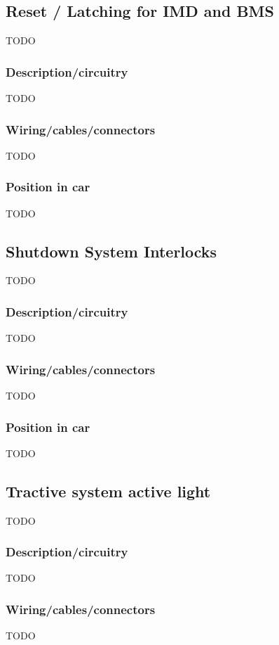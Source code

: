\documentclass{article}
\begin{document}
\subsection{Reset / Latching for IMD and BMS}
TODO

\subsubsection{Description/circuitry}
TODO

\subsubsection{Wiring/cables/connectors}
TODO

\subsubsection{Position in car}
TODO

\subsection{Shutdown System Interlocks}
TODO

\subsubsection{Description/circuitry}
TODO

\subsubsection{Wiring/cables/connectors}
TODO

\subsubsection{Position in car}
TODO

\subsection{Tractive system active light}
TODO

\subsubsection{Description/circuitry}
TODO

\subsubsection{Wiring/cables/connectors}
TODO
\end{document}

